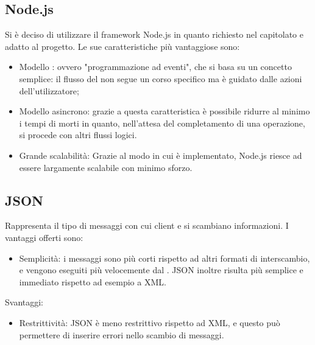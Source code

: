 \subsection{Node.js}
Si è deciso di utilizzare il framework Node.js in quanto richiesto nel capitolato e adatto al progetto. Le sue caratteristiche più vantaggiose sono:
\begin{itemize}
\item Modello : ovvero "programmazione ad eventi", che si basa su un concetto semplice: il flusso del  non segue un corso specifico ma è guidato dalle azioni dell'utilizzatore;
\item Modello asincrono: grazie a questa caratteristica è possibile ridurre al minimo i tempi di morti in quanto, nell'attesa del completamento di una operazione, si procede con altri flussi logici.
\item Grande scalabilità: Grazie al modo in cui è implementato, Node.js riesce ad essere largamente scalabile con minimo sforzo.
\end{itemize}

\subsection{JSON}
Rappresenta il tipo di messaggi con cui client e  si scambiano informazioni. I vantaggi offerti sono:
\begin{itemize}
\item Semplicità: i messaggi  sono più corti rispetto ad altri formati di interscambio, e vengono eseguiti più velocemente dal . JSON inoltre risulta più semplice e immediato rispetto ad esempio a XML.
\end{itemize}
Svantaggi:
\begin{itemize}
\item Restrittività: JSON è meno restrittivo rispetto ad XML, e questo può permettere di inserire errori nello scambio di messaggi.
\end{itemize}

